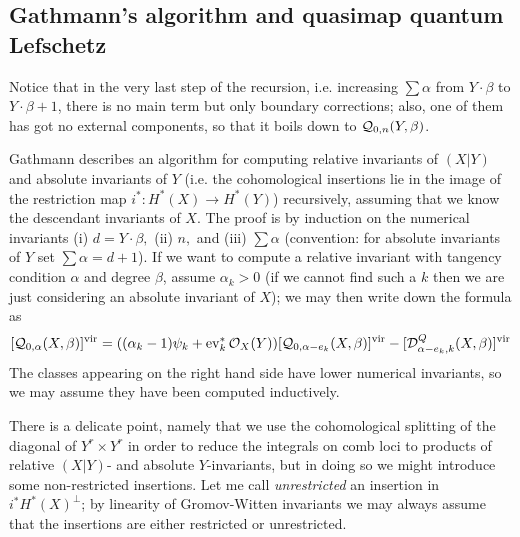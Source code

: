 \subsection{Gathmann's algorithm and quasimap quantum Lefschetz} Notice that in the very last step of the recursion, i.e. increasing $\sum\alpha$ from $Y\cdot \beta$ to $Y\cdot \beta+1$, there is no main term but only boundary corrections; also, one of them has got no external components, so that it boils down to $\mathcal{Q}_{0,n}(Y,\beta)$.

Gathmann describes an algorithm for computing relative invariants of $(X|Y)$ and  absolute invariants of $Y$ (i.e. the cohomological insertions lie in the image of the restriction map $i^*\colon H^*(X)\to H^*(Y)$) recursively, assuming that we know the descendant invariants of $X$. The proof is by induction on the numerical invariants (i) $d=Y\cdot \beta,$ (ii) $n,$ and (iii) $\sum\alpha$ (convention: for absolute invariants of $Y$ set $\sum\alpha=d+1$). If we want to compute a relative invariant with tangency condition $\alpha$ and degree $\beta$, assume $\alpha_k>0$ (if we cannot find such a $k$ then we are just considering an absolute invariant of $X$); we may then write down the formula as
\[[\mathcal{Q}_{0,\alpha}(X,\beta)]^{\mathrm{vir}}=((\alpha_k-1)\psi_k+\operatorname{ev}_k^*\mathcal{O}_X(Y))[\mathcal{Q}_{0,\alpha-e_k}(X,\beta)]^{\mathrm{vir}}-[\mathcal{D}^Q_{\alpha-e_k,k}(X,\beta)]^{\mathrm{vir}}\]
The classes appearing on the right hand side have lower numerical invariants, so we may assume they have been computed inductively.

There is a delicate point, namely that we use the cohomological splitting of the diagonal of $Y^r\times Y^r$ in order to reduce the integrals on comb loci to products of relative $(X|Y)$- and absolute $Y$-invariants, but in doing so we might introduce some non-restricted insertions.
Let me call \emph{unrestricted} an insertion in $i^*H^*(X)^\perp$; by linearity of Gromov-Witten invariants we may always assume that the insertions are either restricted or unrestricted.

